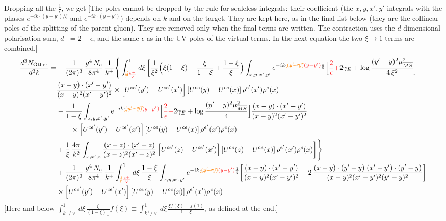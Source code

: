 \documentclass[9pt]{article}
\numberwithin{equation}{section}
\begin{document}
{\color{orange}Dropping all the $\frac{1}{\epsilon}$, we get} {\color{red}[The poles cannot be dropped by the rule for scaleless integrals: their coefficient (the $x,y,x',y'$ integrals with the phases $e^{-ik\cdot(y-y')/\xi}$ and $e^{-ik\cdot(y-y')}$) depends on $k$ and on the target. They are kept here, as in the final list below (they are the collinear poles of the splitting of the parent gluon). They are removed only when the final terms are written. The contraction uses the $d$-dimensional polarisation sum, $d_{\perp}=2-\epsilon$, and the same $\epsilon$ as in the UV poles of the virtual terms. In the next equation the two $\xi\to1$ terms are combined.]}
\begin{align}
\frac{d^{3}N_{\rm Other}}{d^{3}k}= &-\frac{1}{(2\pi)^{3}}\,\frac{g^{4}\,N_{c}}{8\pi^{4}}\,\frac{1}{k^{+}}\Bigg\{\int_{{\color{orange}\cancel{0}}{\color{red}\frac{k^{+}}{\vee}}}^{1}d\xi\,\bigg[\frac{1}{\xi^{2}}\Big(\xi(1-\xi)+\frac{\xi}{1-\xi}+\frac{1-\xi}{\xi}\Big)\int_{x,y,x',y'}e^{-ik\cdot{\color{orange}\cancel{(y'-y)}}{\color{red}(y-y')}\frac{1}{\xi}}\Big[{\color{red}\frac{2}{\epsilon}+}2\gamma_{E}+\log\frac{(y'-y)^{2}\mu^{2}_{\overline{MS}}}{4\,\xi^{2}}\Big]\notag \\ & \frac{(x-y)\cdot(x'-y')}{(x-y)^{2}(x'-y')^{2}}\times\left[U^{ce'}(y') - U^{ce'}(x')\right]\left[U^{ce}(y) - U^{ce}(x)\right]\rho^{e'}(x')\rho^{e}(x)\notag\\
&-\frac{1}{1-\xi}\int_{x,y,x',y'}e^{-ik\cdot{\color{orange}\cancel{(y'-y)}}{\color{red}(y-y')}}\Big[{\color{red}\frac{2}{\epsilon}+}2\gamma_{E}+\log\frac{(y'-y)^{2}\mu^{2}_{\overline{MS}}}{4}\Big]\frac{(x-y)\cdot(x'-y')}{(x-y)^{2}(x'-y')^{2}}\notag \\ & \qquad\times\left[U^{ce'}(y') - U^{ce'}(x')\right]\left[U^{ce}(y) - U^{ce}(x)\right]\rho^{e'}(x')\rho^{e}(x)\notag\\
&+\frac{1}{\xi}\,\frac{4\pi}{k^{2}}\int_{x,x',z}\frac{(x-z)\cdot(x'-z)}{(x-z)^{2}(x'-z)^{2}}\left[U^{ce'}(z) - U^{ce'}(x')\right]\left[U^{ce}(z) - U^{ce}(x)\right]\rho^{e'}(x')\rho^{e}(x)\bigg]\Bigg\}\notag\\
&+\frac{1}{(2\pi)^{3}}\,\frac{g^{4}\,N_{c}}{8\pi^{4}}\,\frac{1}{k^{+}}\int_{{\color{orange}\cancel{0}}{\color{red}\frac{k^{+}}{\vee}}}^{1}d\xi\,\frac{1-\xi}{\xi}\int_{x,y,x',y'}e^{-ik\cdot{\color{orange}\cancel{(y'-y)}}{\color{red}(y-y')}\frac{1}{\xi}}\bigg[\frac{(x-y)\cdot(x'-y')}{(x-y)^{2}(x'-y')^{2}}-2\,\frac{(x-y)\cdot(y'-y)\;(x'-y')\cdot(y'-y)}{(x-y)^{2}(x'-y')^{2}(y'-y)^{2}}\bigg]\notag\\
&\times\left[U^{ce'}(y') - U^{ce'}(x')\right]\left[U^{ce}(y) - U^{ce}(x)\right]\rho^{e'}(x')\rho^{e}(x)
\end{align} {\color{red}[Here and below $\int_{k^{+}/\vee}^{1}d\xi\,\frac{\xi}{(1-\xi)_{+}}f(\xi)\equiv\int_{k^{+}/\vee}^{1}d\xi\,\frac{\xi f(\xi)-f(1)}{1-\xi}$, as defined at the end.]}\par\noindent 
\end{document}

